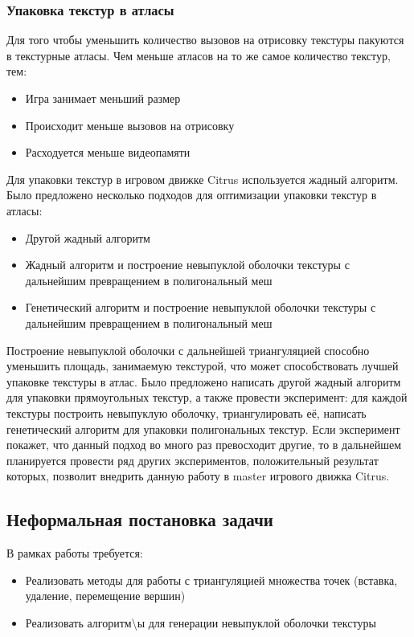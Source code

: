 \documentclass{fefu}
\begin{document}
\subsubsection{Упаковка текстур в атласы}
Для того чтобы уменьшить количество вызовов на отрисовку текстуры пакуются в текстурные атласы. Чем меньше атласов на
то же самое количество текстур, тем:
\begin{itemize}
    \item Игра занимает меньший размер
    \item Происходит меньше вызовов на отрисовку
    \item Расходуется меньше видеопамяти
\end{itemize}
Для упаковки текстур в игровом движке Citrus используется жадный алгоритм. Было предложено несколько подходов для
оптимизации упаковки текстур в атласы:
\begin{itemize}
    \item Другой жадный алгоритм
    \item Жадный алгоритм и построение невыпуклой оболочки текстуры с дальнейшим превращением в полигональный меш
    \item Генетический алгоритм и построение невыпуклой оболочки текстуры с дальнейшим превращением в полигональный меш
\end{itemize}
Построение невыпуклой оболочки с дальнейшей триангуляцией способно уменьшить площадь, занимаемую текстурой, что
может способствовать лучшей упаковке текстуры в атлас. Было предложено написать другой жадный алгоритм для упаковки
прямоугольных текстур, а также провести эксперимент: для каждой текстуры построить невыпуклую оболочку, триангулировать
её, написать генетический алгоритм для упаковки полигональных текстур. Если эксперимент покажет, что данный подход во
много раз превосходит другие, то в дальнейшем планируется провести ряд других экспериментов, положительный результат
которых, позволит внедрить данную работу в master игрового движка Citrus.
\subsection{Неформальная постановка задачи}
В рамках работы требуется:
\begin{itemize}
    \item Реализовать методы для работы с триангуляцией множества точек (вставка, удаление, перемещение вершин)
    \item Реализовать алгоритм\textbackslash ы для генерации невыпуклой оболочки текстуры
\end{itemize}
\end{document}

